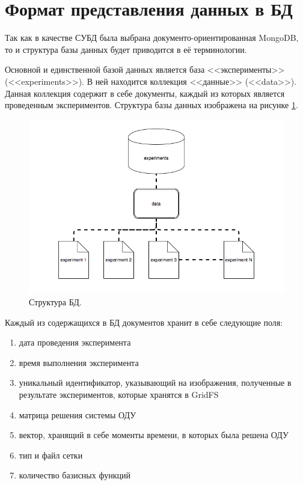 \documentclass[14pt]{extreport}
\begin{document}
\section{Формат представления данных в БД}

Так как в качестве СУБД была выбрана документо-ориентированная MongoDB, то и структура базы данных будет приводится в её терминологии. 

Основной и единственной базой данных является база <<эксперименты>> (<<experiments>>). В ней находится коллекция  <<данные>> (<<data>>). Данная коллекция содержит в себе документы, каждый из которых является проведенным экспериментов. Структура базы данных изображена на рисунке \ref{img:database}.

\begin{figure}[H]
\centerline{
\includegraphics[width=1.0\linewidth]{images/database}}
\caption{Структура БД.}
\label{img:database}
\end{figure}

Каждый из содержащихся в БД документов хранит в себе следующие поля:

\begin{enumerate}
\item дата проведения эксперимента
\item время выполнения эксперимента
\item уникальный идентификатор, указывающий на изображения, полученные в результате экспериментов, которые хранятся в GridFS
\item матрица решения системы ОДУ
\item вектор, хранящий в себе моменты времени, в которых была решена ОДУ
\item тип и файл сетки
\item количество базисных функций
\end{enumerate}
\end{document}
